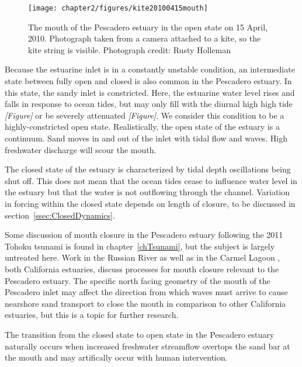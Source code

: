 \begin{figure}
	\begin{center}
		\texttt{[image: chapter2/figures/kite20100415mouth]} 
	\end{center}
\caption{The mouth of the Pescadero estuary in the open state on 15 April, 2010. Photograph taken from a camera attached to a kite, so the kite string is visible. Photograph credit: Rusty Holleman}\label{fig:kite_photos_open} \end{figure}

Because the estuarine inlet is in a constantly unstable condition, an intermediate state between fully open and closed is also common in the Pescadero estuary.  In this state, the sandy inlet is constricted. Here, the estuarine water level rises and falls in response to ocean tides, but may only fill with the diurnal high high tide \emph{[Figure]} or be severely attenuated \emph{[Figure]}. We consider this condition to be a highly-constricted open state. Realistically, the open state of the estuary is a continuum. Sand moves in and out of the inlet with tidal flow and waves. High freshwater discharge will scour the mouth.

The closed state of the estuary is characterized by tidal depth oscillations being shut off. This does not mean that the ocean tides cease to influence water level in the estuary but that the water is not outflowing through the channel. Variation in forcing within the closed
state depends on length of closure, to be discussed in section~\ref{ssec:ClosedDynamics}.

Some discussion of mouth closure in the Pescadero estuary following the 2011 Tohoku tsunami is found in chapter~\ref{chTsunami}, but the subject is largely untreated here. Work in the Russian River \parencite{behrens_russian_2012, behrens_episodic_2013} as well as in the Carmel Lagoon \parencite{rich_hydrologic_2013}, both California estuaries, discuss processes for mouth closure relevant to the Pescadero estuary. The specific north facing geometry of the mouth of the Pescadero inlet may affect the direction from which waves must arrive to cause nearshore sand transport to close the mouth in comparison to other California estuaries, but this is a topic for further research.

The transition from the closed state to open state in the Pescadero estuary naturally occurs when increased freshwater streamflow overtops the sand bar at the mouth and may artifically occur with human intervention. 

